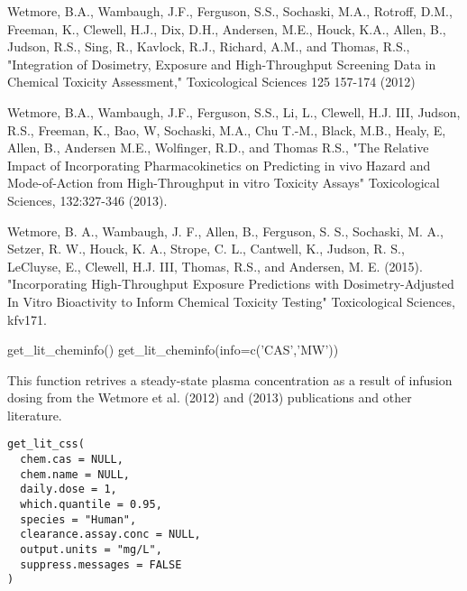 \documentclass[a4paper]{book}
\begin{document}
\begin{References}\relax
Wetmore, B.A., Wambaugh, J.F., Ferguson, S.S., Sochaski, M.A.,
Rotroff, D.M., Freeman, K., Clewell, H.J., Dix, D.H., Andersen, M.E., Houck,
K.A., Allen, B., Judson, R.S., Sing, R., Kavlock, R.J., Richard, A.M., and
Thomas, R.S., "Integration of Dosimetry, Exposure and High-Throughput
Screening Data in Chemical Toxicity Assessment," Toxicological Sciences 125
157-174 (2012)

Wetmore, B.A., Wambaugh, J.F., Ferguson, S.S., Li, L., Clewell, H.J. III,
Judson, R.S., Freeman, K., Bao, W, Sochaski, M.A., Chu T.-M., Black, M.B.,
Healy, E, Allen, B., Andersen M.E., Wolfinger, R.D., and Thomas R.S., "The
Relative Impact of Incorporating Pharmacokinetics on Predicting in vivo
Hazard and Mode-of-Action from High-Throughput in vitro Toxicity Assays"
Toxicological Sciences, 132:327-346 (2013).

Wetmore, B. A., Wambaugh, J. F., Allen, B., Ferguson, S. S., Sochaski, M.
A., Setzer, R. W., Houck, K. A., Strope, C. L., Cantwell, K., Judson, R. S.,
LeCluyse, E., Clewell, H.J. III, Thomas, R.S., and Andersen, M. E. (2015).
"Incorporating High-Throughput Exposure Predictions with Dosimetry-Adjusted
In Vitro Bioactivity to Inform Chemical Toxicity Testing" Toxicological
Sciences, kfv171.
\end{References}
%
\begin{Examples}
\begin{ExampleCode}

get_lit_cheminfo()
get_lit_cheminfo(info=c('CAS','MW'))

\end{ExampleCode}
\end{Examples}
%
\begin{Description}\relax
This function retrives a steady-state plasma concentration as a result of
infusion dosing from the Wetmore et al. (2012) and (2013) publications and
other literature.
\end{Description}
%
\begin{Usage}
\begin{verbatim}
get_lit_css(
  chem.cas = NULL,
  chem.name = NULL,
  daily.dose = 1,
  which.quantile = 0.95,
  species = "Human",
  clearance.assay.conc = NULL,
  output.units = "mg/L",
  suppress.messages = FALSE
)
\end{verbatim}
\end{Usage}
\end{document}

